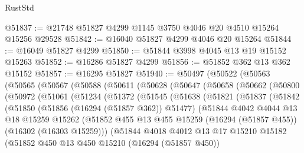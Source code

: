 \begin{lexlean}{RustStd}
\begin{coremodule}
@51837 := @21748 @51827 @4299 @1145 @3750 @4046 @20 @4510 @15264 @15256 @29528
@51842 := @16040 @51827 @4299 @4046 @20 @15264
@51844 := @16049 @51827 @4299
@51850 := @51844 @3998 @4045 @13 @19 @15152 @15263
@51852 := @16286 @51827 @4299
@51856 := @51852 @362 @13 @362 @15152
@51857 := @16295 @51827
@51940 := @50497
    (@50522
      (@50563
        (@50565
          (@50567
            (@50588
              (@50611
                (@50628
                  (@50647
                    (@50658
                      (@50662
                        (@50800
                          (@50972
                            (@51061
                              (@51234
                                (@51372
                                  (@51545
                                    (@51638
                                      (@51821
                                        (@51837
                                          (@51842
                                            (@51850
                                              (@51856 (@16294 (@51857 @362)) @51477)
                                              (@51844
                                                @4042
                                                @4044
                                                @13
                                                @18
                                                @15259
                                                @15262
                                                (@51852
                                                  @455
                                                  @13
                                                  @455
                                                  @15259
                                                  (@16294 (@51857 @455))
                                                  (@16302 (@16303 @15259)))
                                                (@51844
                                                  @4018
                                                  @4012
                                                  @13
                                                  @17
                                                  @15210
                                                  @15182
                                                  (@51852
                                                    @450
                                                    @13
                                                    @450
                                                    @15210
                                                    (@16294 (@51857 @450))

\end{coremodule}
\end{lexlean}
